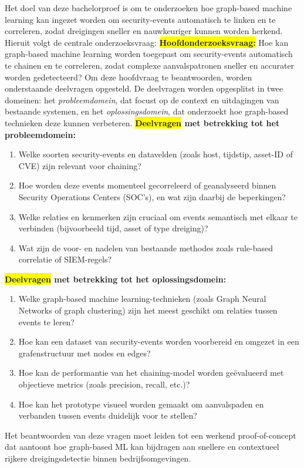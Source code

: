 Het doel van deze bachelorproef is om te onderzoeken hoe graph-based machine learning kan ingezet worden om security-events automatisch te linken en te correleren, zodat dreigingen sneller en nauwkeuriger kunnen worden herkend. \newline 
Hieruit volgt de centrale onderzoeksvraag:
\newline
\newline
\colorbox{yellow}{
    \textbf{Hoofdonderzoeksvraag:}}
    Hoe kan graph-based machine learning worden toegepast om security-events automatisch te chainen en te correleren, zodat complexe aanvalspatronen sneller en accurater worden gedetecteerd?
\newline
\newline
Om deze hoofdvraag te beantwoorden, worden onderstaande deelvragen opgesteld.  
De deelvragen worden opgesplitst in twee domeinen: het \emph{probleemdomein}, dat focust op de context en uitdagingen van bestaande systemen, en het \emph{oplossingsdomein}, dat onderzoekt hoe graph-based technieken deze kunnen verbeteren.
\newline
\newline
    \textbf{\colorbox{yellow}{Deelvragen} met betrekking tot het probleemdomein:}
    \begin{enumerate}
        \item Welke soorten security-events en datavelden (zoals host, tijdstip, asset-ID of CVE) zijn relevant voor chaining?
        \item Hoe worden deze events momenteel gecorreleerd of geanalyseerd binnen Security Operations Centers (SOC’s), en wat zijn daarbij de beperkingen?
        \item Welke relaties en kenmerken zijn cruciaal om events semantisch met elkaar te verbinden (bijvoorbeeld tijd, asset of type dreiging)?
        \item Wat zijn de voor- en nadelen van bestaande methodes zoals rule-based correlatie of SIEM-regels?
\end{enumerate}
    \textbf{\colorbox{yellow}{Deelvragen} met betrekking tot het oplossingsdomein:}
    \begin{enumerate}
        \item Welke graph-based machine learning-\newline technieken (zoals Graph Neural Networks of graph clustering) zijn het meest geschikt om relaties tussen events te leren?
        \item Hoe kan een dataset van security-events worden voorbereid en omgezet in een grafenstructuur met nodes en edges?
        \item Hoe kan de performantie van het chaining-model worden geëvalueerd met objectieve metrics (zoals precision, recall, etc.)?
        \item Hoe kan het prototype visueel worden gemaakt om aanvalspaden en verbanden tussen events duidelijk voor te stellen?
\end{enumerate}
Het beantwoorden van deze vragen moet leiden tot een werkend proof-of-concept dat aantoont hoe graph-based ML kan bijdragen aan snellere en contextueel rijkere dreigingsdetectie binnen bedrijfsomgevingen.



